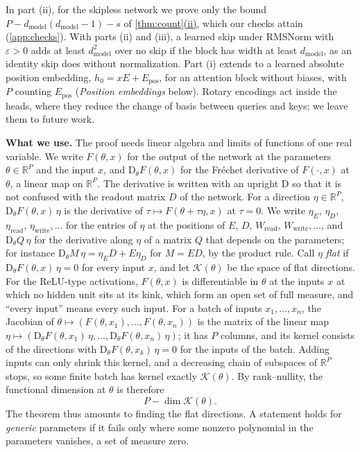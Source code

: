 \documentclass[10pt]{article}
\theoremstyle{definition}
\theoremstyle{remark}
\newcommand{\R}{\mathbb{R}}
\newcommand{\Wread}{W_{\mathrm{read}}}
\newcommand{\Wwrite}{W_{\mathrm{write}}}
\newcommand{\dm}{d_{\mathrm{model}}}
\newcommand{\Der}{\mathrm{D}}
\newcommand{\para}[1]{\smallskip\noindent\textbf{#1}\hspace{0.5em}}
\DeclareRobustCommand{\cpref}[2]{\hyperref[#1:#2]{\cref*{#1}(#2)}}
\begin{document}
In part (ii), for the skipless network we prove only the bound $P - \dm(\dm-1) - s$ of \cpref{thm:count}{ii}, which our checks attain (\cref{app:checks}). With parts (ii) and (iii), a learned skip under RMSNorm with $\varepsilon > 0$ adds at least $\dm^2$ over no skip if the block has width at least $\dm$, as an identity skip does without normalization. Part (i) extends to a learned absolute position embedding, $h_0 = xE + E_{\mathrm{pos}}$, for an attention block without biases, with $P$ counting $E_{\mathrm{pos}}$ (\emph{Position embeddings} below). Rotary encodings act inside the heads, where they reduce the change of basis between queries and keys; we leave them to future work.

\para{What we use.} The proof needs linear algebra and limits of functions of one real variable. We write $F(\theta, x)$ for the output of the network at the parameters $\theta \in \R^P$ and the input $x$, and $\Der_\theta F(\theta, x)$ for the Fr\'echet derivative of $F(\cdot, x)$ at $\theta$, a linear map on $\R^P$. The derivative is written with an upright $\Der$ so that it is not confused with the readout matrix $D$ of the network. For a direction $\eta \in \R^P$, $\Der_\theta F(\theta, x)\,\eta$ is the derivative of $\tau \mapsto F(\theta + \tau\eta, x)$ at $\tau = 0$. We write $\eta_E$, $\eta_D$, $\eta_{\mathrm{read}}$, $\eta_{\mathrm{write}}, \dots$ for the entries of $\eta$ at the positions of $E$, $D$, $\Wread$, $\Wwrite, \dots$, and $\Der_\theta Q\,\eta$ for the derivative along $\eta$ of a matrix $Q$ that depends on the parameters; for instance $\Der_\theta M\,\eta = \eta_ED + E\eta_D$ for $M = ED$, by the product rule. Call $\eta$ \emph{flat} if $\Der_\theta F(\theta, x)\,\eta = 0$ for every input $x$, and let $\mathcal K(\theta)$ be the space of flat directions. For the ReLU-type activations, $F(\theta, x)$ is differentiable in $\theta$ at the inputs $x$ at which no hidden unit sits at its kink, which form an open set of full measure, and ``every input'' means every such input. For a batch of inputs $x_1, \dots, x_n$, the Jacobian of $\theta \mapsto (F(\theta, x_1), \dots, F(\theta, x_n))$ is the matrix of the linear map $\eta \mapsto (\Der_\theta F(\theta, x_1)\,\eta, \dots, \Der_\theta F(\theta, x_n)\,\eta)$; it has $P$ columns, and its kernel consists of the directions with $\Der_\theta F(\theta, x_k)\,\eta = 0$ for the inputs of the batch. Adding inputs can only shrink this kernel, and a decreasing chain of subspaces of $\R^P$ stops, so some finite batch has kernel exactly $\mathcal K(\theta)$. By rank--nullity, the functional dimension at $\theta$ is therefore
\[
P - \dim\mathcal K(\theta).
\]
The theorem thus amounts to finding the flat directions. A statement holds for \emph{generic} parameters if it fails only where some nonzero polynomial in the parameters vanishes, a set of measure zero.
\end{document}
